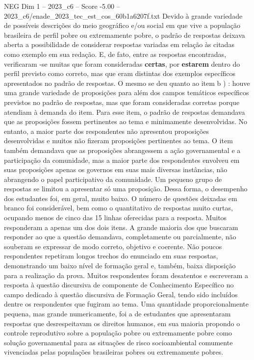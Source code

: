 \begin{textsample}{NEG Dim 1 – 2023\_c6 – Score -5.00 – 2023\_c6/enade\_2023\_tec\_est\_cos\_60b1a6207f.txt}
Devido à grande variedade de possíveis descrições do meio geográfico e/ou social em que vive a população brasileira de perfil pobre ou extremamente pobre, o padrão de respostas deixava aberta a possibilidade de considerar respostas variadas em relação às citadas como exemplo em sua redação.
E, de fato, entre as respostas encontradas, verificaram -se muitas que foram consideradas \textbf{certas}, por \textbf{estarem} dentro do perfil previsto como correto, mas que eram distintas dos exemplos específicos apresentados no padrão de respostas.
O mesmo se deu quanto ao item b ) : houve uma grande variedade de proposições para além dos campos temáticos específicos previstos no padrão de respostas, mas que foram consideradas corretas porque atendiam à demanda do item.
Para esse item, o padrão de respostas demandava que as proposições fossem pertinentes ao tema e minimamente desenvolvidas.
No entanto, a maior parte dos respondentes não apresentou proposições desenvolvidas e muitos não fizeram proposições pertinentes ao tema.
O item também demandava que as proposições abrangessem a ação governamental e a participação da comunidade, mas a maior parte dos respondentes envolveu em suas proposições apenas os governos em suas mais diversas instâncias, não abrangendo o papel participativo da comunidade.
Um pequeno grupo de respostas se limitou a apresentar só uma proposição.
Dessa forma, o desempenho dos estudantes foi, em geral, muito baixo.
O número de questões deixadas em branco foi considerável, bem como o quantitativo de respostas muito curtas, ocupando menos de cinco das 15 linhas oferecidas para a resposta.
Muitos responderam a apenas um dos dois itens.
A grande maioria dos que buscaram responder ao que a questão demandava, completamente ou parcialmente, não souberam se expressar de modo correto, objetivo e coerente.
Não poucos respondentes repetiram longos trechos do enunciado em suas respostas, demonstrando um baixo nível de formação geral e, também, baixa disposição para a realização da prova.
Muitos respondentes foram desatentos e escreveram a resposta à questão discursiva de componente de Conhecimento Específico no campo dedicado à questão discursiva de Formação Geral, tendo sido incluídos dentre os respondentes que fugiram ao tema.
Uma quantidade proporcionalmente pequena, mas grande numericamente, foi a de estudantes que apresentaram respostas que desrespeitavam os direitos humanos, em sua maioria propondo o controle reprodutivo sobre a população pobre ou extremamente pobre como solução governamental para as situações de risco socioambiental comumente vivenciadas pelas populações brasileiras pobres ou extremamente pobres.

\end{textsample}
